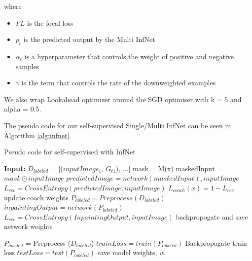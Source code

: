 where
\begin{itemize}
	\item  $FL$ is the focal loss
	\item $p_t$ is the predicted output by the Multi InfNet
	\item $\alpha_t$ is a hyperparameter that controls the weight of positive and negative samples
	\item $\gamma$ is the term that controls the rate of the downweighted examples
\end{itemize}

We also wrap Lookahead optimizer around the SGD optimiser with k = 5 and alpha = 0.5.

The pseudo code for our self-supervised Single/Multi InfNet can be seen in Algorithm \ref{alg:infnet}.


\begin{algorithm}
	\caption{Pseudo code for self-supervised with InfNet}
	\label{alg:self-inf-net}
	\begin{algorithmic}
		\STATE \textbf{Input:} $D_{labeled}$ = [($inputImage_1$, $G_{t1}$), ...]
		\STATE mask = M(x)
		\STATE maskedInput = $mask \odot inputImage$
		\STATE $ predictedImage =network(maskedInput), inputImage$
		\STATE $L_{rec} = CrossEntropy(predictedImage, inputImage)$
		\STATE $L_{coach}(x) = 1 - L_{rec}$
		\STATE update coach weights
		\ENDFOR
		\STATE $P_{labeled} = Preprocess(D_{labeled})$
		\STATE $inpaintingOutput = network(P_{labeled})$
		\STATE $L_{rec} = CrossEntropy(InpaintingOutput, inputImage)$
		\STATE backpropogate and save network weights
		\ENDFOR
		\ENDFOR 
		
		
		\STATE $P_{labeled}$ = Preprocess ($D_{labeled}$)
		\STATE $trainLoss = train(P_{labeled})$
		\STATE Backpropagate train loss
		\STATE $testLoss = test(P_{labeled})$
		\STATE save model weights, \textit{w}.
		\ENDFOR
	\end{algorithmic}
	\label{alg:infnet}
\end{algorithm}






